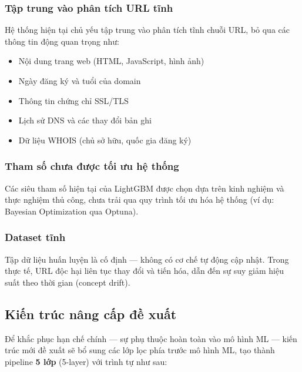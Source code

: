 \documentclass[a4paper,12pt]{article}
\begin{document}
\subsubsection{Tập trung vào phân tích URL tĩnh}

Hệ thống hiện tại chủ yếu tập trung vào phân tích tĩnh chuỗi URL, bỏ qua các thông tin động quan trọng như:
\begin{itemize}
    \item Nội dung trang web (HTML, JavaScript, hình ảnh)
    \item Ngày đăng ký và tuổi của domain
    \item Thông tin chứng chỉ SSL/TLS
    \item Lịch sử DNS và các thay đổi bản ghi
    \item Dữ liệu WHOIS (chủ sở hữu, quốc gia đăng ký)
\end{itemize}

\subsubsection{Tham số chưa được tối ưu hệ thống}

Các siêu tham số hiện tại của LightGBM được chọn dựa trên kinh nghiệm và thực nghiệm thủ công, chưa trải qua quy trình tối ưu hóa hệ thống (ví dụ: Bayesian Optimization qua Optuna).

\subsubsection{Dataset tĩnh}

Tập dữ liệu huấn luyện là cố định --- không có cơ chế tự động cập nhật. Trong thực tế, URL độc hại liên tục thay đổi và tiến hóa, dẫn đến sự suy giảm hiệu suất theo thời gian (concept drift).

\subsection{Kiến trúc nâng cấp đề xuất}
\label{sec:proposed_arch}

Để khắc phục hạn chế chính --- sự phụ thuộc hoàn toàn vào mô hình ML --- kiến trúc mới đề xuất sẽ bổ sung các lớp lọc phía trước mô hình ML, tạo thành pipeline \textbf{5 lớp} (5-layer) với trình tự như sau:
\end{document}
